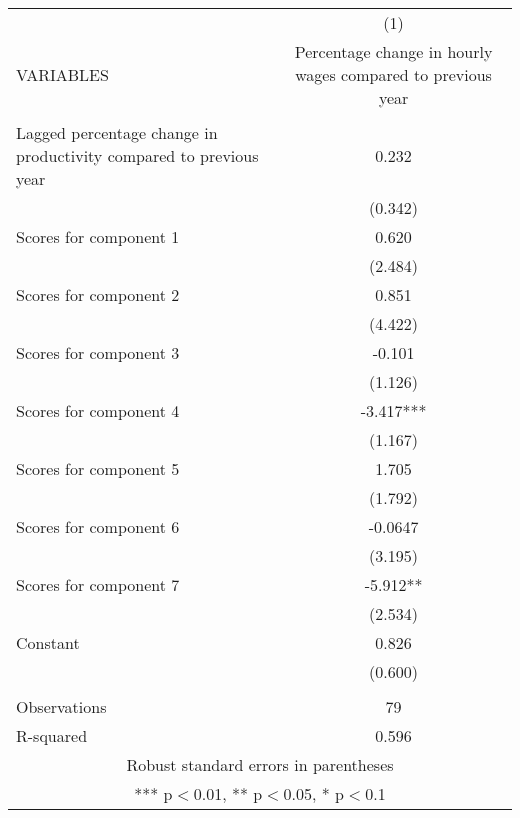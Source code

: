 \documentclass[]{article}
\begin{document}
\begin{tabular}{lc} \hline
 & (1) \\
VARIABLES & Percentage change in hourly wages compared to previous year \\ \hline
 &  \\
Lagged percentage change in productivity compared to previous year & 0.232 \\
 & (0.342) \\
Scores for component 1 & 0.620 \\
 & (2.484) \\
Scores for component 2 & 0.851 \\
 & (4.422) \\
Scores for component 3 & -0.101 \\
 & (1.126) \\
Scores for component 4 & -3.417*** \\
 & (1.167) \\
Scores for component 5 & 1.705 \\
 & (1.792) \\
Scores for component 6 & -0.0647 \\
 & (3.195) \\
Scores for component 7 & -5.912** \\
 & (2.534) \\
Constant & 0.826 \\
 & (0.600) \\
 &  \\
Observations & 79 \\
 R-squared & 0.596 \\ \hline
\multicolumn{2}{c}{ Robust standard errors in parentheses} \\
\multicolumn{2}{c}{ *** p$<$0.01, ** p$<$0.05, * p$<$0.1} \\
\end{tabular}
\end{document}
